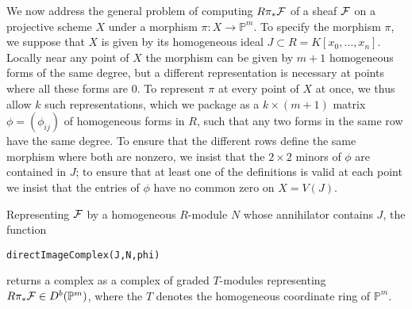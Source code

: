 \documentclass[twoside,12pt, leqno]{amsart}
\def\PP{{\mathbb P}}
\begin{document}
We now address the general problem of computing $R\pi_* {\mathcal F}$ of a sheaf ${\mathcal F}$ on a projective scheme $X$ under a morphism 
$
\pi \colon X \to \PP^m.
$
%
To specify the morphism $\pi$, we suppose that $X$ is given by its homogeneous ideal $J \subset R = K[x_0,\ldots,x_n]$. Locally near any point of $X$ the morphism can be given by $m+1$ homogeneous
forms of the same degree, but a different representation is necessary at points where all these forms are 0. To represent $\pi$
at every point of $X$ at once, we thus allow $k$ such representations, which we package as a
 $k \times (m+1)$ matrix $\phi=(\phi_{ij})$ of homogeneous forms in $R$, such that any two forms
 in the same row have the same degree. To ensure that the different rows define the same
 morphism where both are nonzero, we insist that the $2\times 2$ minors of $\phi$ are contained in $J$;
 to ensure that at least one of the definitions is valid at each point we insist that the entries of $\phi$ have no common zero on $X=V(J)$.

Representing ${\mathcal F}$ by  a homogeneous $R$-module $N$
whose annihilator contains $J$, the function
{\small \begin{verbatim}
directImageComplex(J,N,phi)
\end{verbatim} }
\noindent returns a complex as a complex of graded $T$-modules representing $R\pi_* \sF \in D^b(\PP^m)$, where the $T$ denotes  the homogeneous coordinate ring of $\PP^m$.
\end{document}
